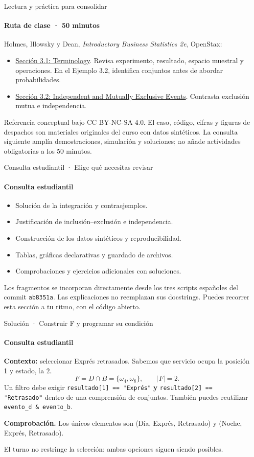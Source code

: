 \documentclass[aspectratio=169,11pt,spanish]{beamer}
\newcommand{\ruta}{Ruta de clase · 50 minutos}
\newcommand{\verifica}[1]{\par\smallskip\textbf{Comprobación.} #1\par}
\begin{document}
\begin{frame}{Lectura y práctica para consolidar}
\framesubtitle{Ruta de clase · 50 minutos}
Holmes, Illowsky y Dean, \emph{Introductory Business Statistics 2e}, OpenStax:
\begin{itemize}
\item \href{https://openstax.org/books/introductory-business-statistics-2e/pages/3-1-terminology}{Sección 3.1: Terminology}. Revisa experimento, resultado, espacio muestral y operaciones. En el Ejemplo 3.2, identifica conjuntos antes de abordar probabilidades.
\item \href{https://openstax.org/books/introductory-business-statistics-2e/pages/3-2-independent-and-mutually-exclusive-events}{Sección 3.2: Independent and Mutually Exclusive Events}. Contrasta exclusión mutua e independencia.
\end{itemize}
{\small Referencia conceptual bajo CC BY-NC-SA 4.0. El caso, código, cifras y figuras de despachos son materiales originales del curso con datos sintéticos.}
\medskip
La consulta siguiente amplía demostraciones, simulación y soluciones; no añade actividades obligatorias a los 50 minutos.
\end{frame}

\renewcommand{\ruta}{Consulta estudiantil}
\begin{frame}[label=consulta]{Consulta estudiantil · Elige qué necesitas revisar}
\framesubtitle{Consulta estudiantil}
\begin{itemize}
\item Solución de la integración y contraejemplos.
\item Justificación de inclusión--exclusión e independencia.
\item Construcción de los datos sintéticos y reproducibilidad.
\item Tablas, gráficas declarativas y guardado de archivos.
\item Comprobaciones y ejercicios adicionales con soluciones.
\end{itemize}
Los fragmentos se incorporan directamente desde los tres scripts españoles del commit \texttt{ab8351a}. Las explicaciones no reemplazan sus docstrings.
\medskip
Puedes recorrer esta sección a tu ritmo, con el código abierto.
\end{frame}

\begin{frame}[label=solucion]{Solución · Construir F y programar su condición}
\framesubtitle{Consulta estudiantil}
\textbf{Contexto:} seleccionar Exprés retrasados. Sabemos que servicio ocupa la posición 1 y estado, la 2.
\[
F=D\cap B=\{\omega_4,\omega_8\},\qquad |F|=2.
\]
Un filtro debe exigir \texttt{resultado[1] == "Exprés"} \textbf{y}
\texttt{resultado[2] == "Retrasado"} dentro de una comprensión de conjuntos.
También puedes reutilizar \texttt{evento\_d \& evento\_b}.
\verifica{Los únicos elementos son (Día, Exprés, Retrasado) y (Noche, Exprés, Retrasado).}
El turno no restringe la selección: ambas opciones siguen siendo posibles.
\end{frame}
\end{document}
